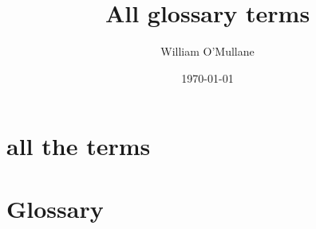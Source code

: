 \documentclass[DM,lsstdraft,authoryear,toc]{lsstdoc}
\title[full glossary]{All glossary terms}
\author{
William O'Mullane
}
\date{\today}
\begin{document}
\mkshorttitle

\section{all the terms }


\section{Glossary }
%
\printglossaries
\end{document}
